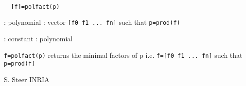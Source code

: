 
\begin{mandesc}
   \\ %
\end{mandesc}
\begin{calling_sequence}
\begin{verbatim}
  [f]=polfact(p)  
\end{verbatim}
\end{calling_sequence}
\begin{parameters}
  \begin{varlist}
    : polynomial
    : vector \verb![f0 f1 ... fn]! such that \verb!p=prod(f)!
    \begin{varlist}
      : constant
      : polynomial
    \end{varlist}
  \end{varlist}
\end{parameters}
\begin{mandescription}
  \verb!f=polfact(p)! returns the minimal factors of p i.e. \verb!f=[f0 f1 ... fn]! such 
  that \verb!p=prod(f)!
\end{mandescription}
\begin{manseealso}
      
\end{manseealso}
\begin{authors}
  S. Steer INRIA
\end{authors}
